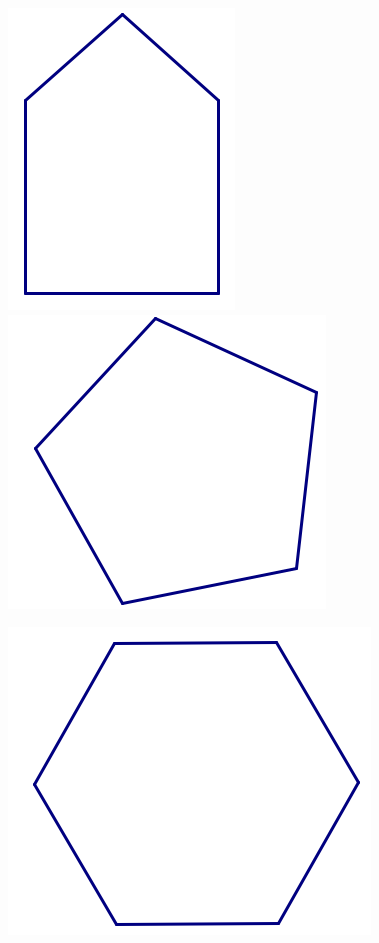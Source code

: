 \begin{center}
\includegraphics[scale=0.95]{pent1}
\includegraphics[scale=0.95]{pentagon}

\includegraphics[scale=0.85]{hexagon}



\end{center}
